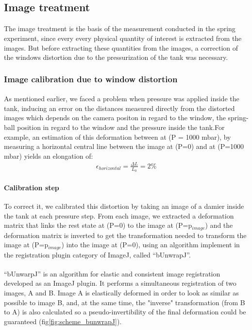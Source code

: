 \subsection{Image treatment}
\paragraph{}
 The image treatment is the basis of the measurement conducted in the spring experiment, since every every physical quantity of interest is extracted from the images. But before extracting these quantities from the images, a correction of the windows distortion due to the pressurization of the tank was necessary.
\subsubsection{Image calibration due to window distortion}
\paragraph{}
As mentioned earlier, we faced a problem when pressure was applied inside the tank, inducing an error on the distances measured directly from the distorted images which depends on the camera positon in regard to the window, the spring-ball position in regard to the window and the pressure inside the tank.For example, an estimation of this deformation between at (P = 1000 mbar), by measuring a horizontal central line between the image at (P=0) and at (P=1000 mbar) yields an elongation of:
\begin{align}
	\epsilon_{horizontal} = \frac{\Delta L}{L_0} = 2\%
\end{align}
\paragraph{Calibration step} 
To correct it, we calibrated this distortion by taking an image of a damier inside the tank at each pressure step. 
 From each image, we extracted a deformation matrix that links the rest state at (P=0) to the image at (P=p$_{image}$) and the deformation matrix is inverted to get the transformation needed to transform the image at (P=p$_{image}$) into the image at (P=0), using an algorithm implement in the registration plugin category of ImageJ, called "`bUnwrapJ"'.
\paragraph{}
"`bUnwarpJ"' is an algorithm for elastic and consistent image registration developed as an ImageJ plugin. It performs a simultaneous registration of two images, A and B. Image A is elastically deformed in order to look as similar as possible to image B, and, at the same time, the "inverse" transformation (from B to A) is also calculated so a pseudo-invertibility of the final deformation could be guaranteed (fig\ref{fig:scheme_bunwrapJ}).

